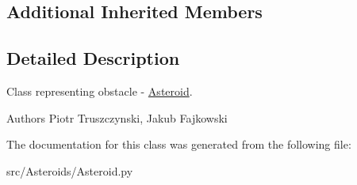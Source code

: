 \subsection*{Additional Inherited Members}


\subsection{Detailed Description}
Class representing obstacle -\/ \hyperlink{classAsteroid_1_1Asteroid}{Asteroid}. 

\begin{DoxyAuthor}{Authors}
Piotr Truszczynski, Jakub Fajkowski 
\end{DoxyAuthor}


The documentation for this class was generated from the following file\+:\begin{DoxyCompactItemize}
\item 
src/\+Asteroids/Asteroid.\+py\end{DoxyCompactItemize}
